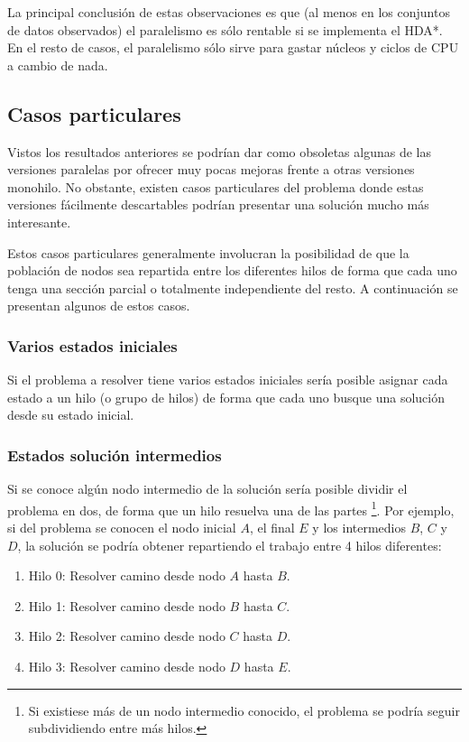 La principal conclusión de estas observaciones es que
(al menos en los conjuntos de datos observados)
el paralelismo es sólo rentable si se implementa el HDA*.
En el resto de casos, el paralelismo sólo sirve para
gastar núcleos y ciclos de CPU a cambio de nada.

\pagebreak

\subsection{Casos particulares}

Vistos los resultados anteriores
se podrían dar como obsoletas algunas de las versiones
paralelas por ofrecer muy pocas mejoras frente a otras
versiones monohilo.
No obstante, existen casos particulares del problema
donde estas versiones fácilmente descartables
podrían presentar una solución mucho más interesante.

Estos casos particulares generalmente involucran
la posibilidad de que la población de nodos sea
repartida entre los diferentes hilos de forma
que cada uno tenga una sección parcial o totalmente
independiente del resto.
A continuación se presentan algunos de estos casos.

\subsubsection{Varios estados iniciales}

Si el problema a resolver tiene varios estados iniciales
sería posible asignar cada estado a un hilo (o grupo de hilos)
de forma que cada uno busque una solución desde su estado inicial.

\subsubsection{Estados solución intermedios}

Si se conoce algún nodo intermedio de la solución
sería posible dividir el problema en dos,
de forma que un hilo resuelva una de las partes
\footnote{Si existiese más de un nodo intermedio conocido,
el problema se podría seguir subdividiendo entre más hilos.}.
Por ejemplo, si del problema se conocen el nodo inicial $A$,
el final $E$ y los intermedios $B$, $C$ y $D$,
la solución se podría obtener repartiendo el
trabajo entre 4 hilos diferentes:
\begin{enumerate}[start=0, itemsep=0.25px]
    \item Hilo 0: Resolver camino desde nodo $A$ hasta $B$.
    \item Hilo 1: Resolver camino desde nodo $B$ hasta $C$.
    \item Hilo 2: Resolver camino desde nodo $C$ hasta $D$.
    \item Hilo 3: Resolver camino desde nodo $D$ hasta $E$.
\end{enumerate}
